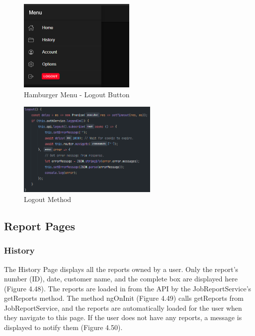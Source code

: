 \begin{figure}[H]
    \caption{Hamburger Menu - Logout Button}
    \label{image:logoutButton}
    \centering
    \includegraphics[width=0.5\textwidth]{images/repota/UI/logout.png}
\end{figure}

\begin{figure}[H]
    \caption{Logout Method}
    \label{image:logoutMethod}
    \centering
    \includegraphics[width=0.6\textwidth]{images/repota/account_pages/logout_method.png}
\end{figure}

\subsection{Report Pages}

\subsubsection{History}
The History Page displays all the reports owned by a user. Only the report's number (ID), date, customer name, and the complete box are displayed here (Figure 4.48). The reports are loaded in from the API by the JobReportService's getReports method. The method ngOnInit (Figure 4.49) calls getReports from JobReportService, and the reports are automatically loaded for the user when they navigate to this page. If the user does not have any reports, a message is displayed to notify them (Figure 4.50). 

